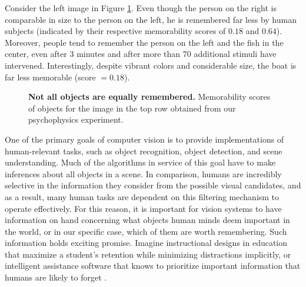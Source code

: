 

Consider the left image in Figure \ref{fig:introPhoto}. Even though the person on the right is comparable in size to the person on the left, he is remembered far less by human subjects (indicated by their respective memorability scores of $0.18$ and $0.64$). Moreover, people tend to remember the person on the left and the fish in the center, even after $3$ minutes and after more than 70 additional stimuli have intervened. Interestingly, despite vibrant colors and considerable size, the boat is far less memorable (score $= 0.18$). 

\begin{figure}[!htb]
\centering
{}
\vspace{-5mm}\caption{\footnotesize\textbf{Not all objects are equally remembered.} Memorability scores of objects for the image in the top row obtained from our psychophysics experiment. }\label{fig:introPhoto}
\end{figure}

One of the primary goals of computer vision is to provide implementations of human-relevant tasks, such as object recognition, object detection, and scene understanding. Much of the algorithms in service of this goal have to make inferences about all objects in a scene. In comparison, humans are incredibly selective in the information they consider from the possible visual candidates, and as a result, many human tasks are dependent on this filtering mechanism to operate effectively. For this reason, it is important for vision systems to have information on hand concerning what objects human minds deem important  in the world, or in our specific case, which of them are worth remembering. Such information holds exciting promise. Imagine instructional designs in education that maximize a student's retention while minimizing distractions implicitly, or intelligent assistance software that knows to prioritize important information that humans are likely to forget . 

